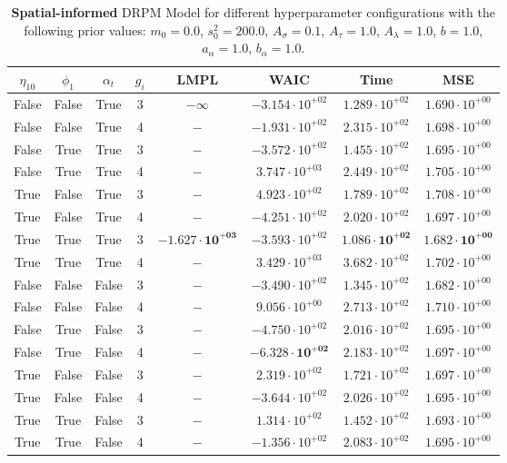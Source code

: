 \begin{table}
\caption{\textbf{Spatial-informed} DRPM Model for different hyperparameter configurations with the following prior values: $m_0 = 0.0$, $s_0^2 = 200.0$, $A_\sigma = 0.1$, $A_\tau = 1.0$, $A_\lambda = 1.0$, $b = 1.0$, $a_\alpha = 1.0$, $b_\alpha = 1.0$.}
\centering\begin{tabular}{cccccccc}
\toprule
$\eta_{10}$ & $\phi_1$ & $\alpha_t$ & $g_i$ & LMPL & WAIC & Time & MSE \\
\midrule
False & False & True & 3 & $-\infty$ & $-3.154 \cdot 10^{+02}$ & $1.289 \cdot 10^{+02}$ & $1.690 \cdot 10^{+00}$ \\
False & False & True & 4 & $-$ & $-1.931 \cdot 10^{+02}$ & $2.315 \cdot 10^{+02}$ & $1.698 \cdot 10^{+00}$ \\
False & True & True & 3 & $-$ & $-3.572 \cdot 10^{+02}$ & $1.455 \cdot 10^{+02}$ & $1.695 \cdot 10^{+00}$ \\
False & True & True & 4 & $-$ & $3.747 \cdot 10^{+03}$ & $2.449 \cdot 10^{+02}$ & $1.705 \cdot 10^{+00}$ \\
True & False & True & 3 & $-$ & $4.923 \cdot 10^{+02}$ & $1.789 \cdot 10^{+02}$ & $1.708 \cdot 10^{+00}$ \\
True & False & True & 4 & $-$ & $-4.251 \cdot 10^{+02}$ & $2.020 \cdot 10^{+02}$ & $1.697 \cdot 10^{+00}$ \\
True & True & True & 3 & $\mathbf{-1.627 \cdot 10^{+03}}$ & $-3.593 \cdot 10^{+02}$ & $\mathbf{1.086 \cdot 10^{+02}}$ & $\mathbf{1.682 \cdot 10^{+00}}$ \\
True & True & True & 4 & $-$ & $3.429 \cdot 10^{+03}$ & $3.682 \cdot 10^{+02}$ & $1.702 \cdot 10^{+00}$ \\
False & False & False & 3 & $-$ & $-3.490 \cdot 10^{+02}$ & $1.345 \cdot 10^{+02}$ & $1.682 \cdot 10^{+00}$ \\
False & False & False & 4 & $-$ & $9.056 \cdot 10^{+00}$ & $2.713 \cdot 10^{+02}$ & $1.710 \cdot 10^{+00}$ \\
False & True & False & 3 & $-$ & $-4.750 \cdot 10^{+02}$ & $2.016 \cdot 10^{+02}$ & $1.695 \cdot 10^{+00}$ \\
False & True & False & 4 & $-$ & $\mathbf{-6.328 \cdot 10^{+02}}$ & $2.183 \cdot 10^{+02}$ & $1.697 \cdot 10^{+00}$ \\
True & False & False & 3 & $-$ & $2.319 \cdot 10^{+02}$ & $1.721 \cdot 10^{+02}$ & $1.697 \cdot 10^{+00}$ \\
True & False & False & 4 & $-$ & $-3.644 \cdot 10^{+02}$ & $2.026 \cdot 10^{+02}$ & $1.695 \cdot 10^{+00}$ \\
True & True & False & 3 & $-$ & $1.314 \cdot 10^{+02}$ & $1.452 \cdot 10^{+02}$ & $1.693 \cdot 10^{+00}$ \\
True & True & False & 4 & $-$ & $-1.356 \cdot 10^{+02}$ & $2.083 \cdot 10^{+02}$ & $1.695 \cdot 10^{+00}$ \\
\bottomrule
\end{tabular}
\end{table}
